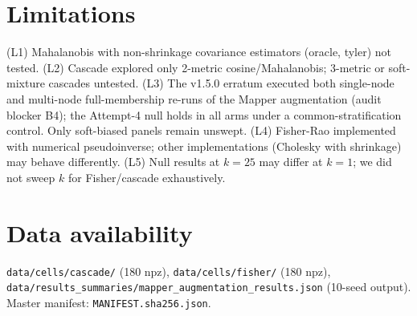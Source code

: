 \documentclass[11pt]{article}
\begin{document}
\section{Limitations}
(L1) Mahalanobis with non-shrinkage covariance estimators (oracle, tyler) not tested.
(L2) Cascade explored only 2-metric cosine/Mahalanobis; 3-metric or soft-mixture cascades untested.
(L3) The v1.5.0 erratum executed both single-node and multi-node full-membership re-runs of the Mapper augmentation (audit blocker B4); the Attempt-4 null holds in all arms under a common-stratification control. Only soft-biased panels remain unswept.
(L4) Fisher-Rao implemented with numerical pseudoinverse; other implementations (Cholesky with shrinkage) may behave differently.
(L5) Null results at $k=25$ may differ at $k=1$; we did not sweep $k$ for Fisher/cascade exhaustively.

\section{Data availability}
\texttt{data/cells/cascade/} (180 npz), \texttt{data/cells/fisher/} (180 npz), \texttt{data/results\_summaries/mapper\_augmentation\_results.json} (10-seed output). Master manifest: \texttt{MANIFEST.sha256.json}.



\end{document}
